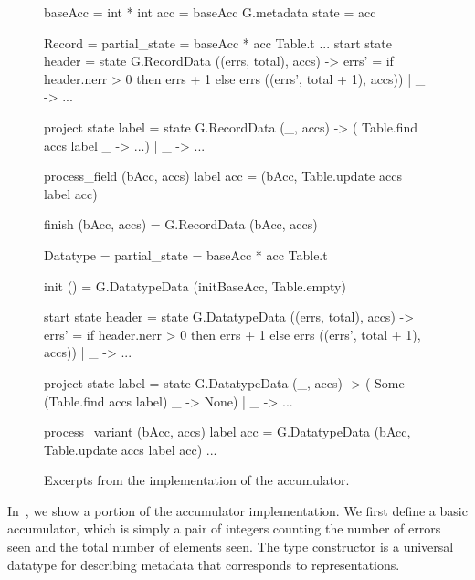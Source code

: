 \begin{figure}
\begin{code}\scriptsize
{} baseAcc = int * int
 acc = baseAcc G.metadata
 state = acc

 Record = 
   partial_state = baseAcc * acc Table.t
  ... 
   start state header =
     state 
      G.RecordData ((errs, total), accs) ->
	 errs' = if header.nerr > 0
                    then errs + 1 else errs
	 ((errs', total + 1), accs))
    | _ ->  ...
	  
   project state label =  state 
      G.RecordData (_, accs) -> ( Table.find accs label
                                  _ ->  ...)
    | _ ->  ...

   process_field (bAcc, accs) label acc =
    (bAcc, Table.update accs label acc)
      
   finish (bAcc, accs) = G.RecordData (bAcc, accs)
    
 Datatype = 
   partial_state = baseAcc * acc Table.t
	
   init () = G.DatatypeData (initBaseAcc, Table.empty)

   start state header = 
     state 
      G.DatatypeData ((errs, total), accs) ->
	 errs' = if header.nerr > 0
                    then errs + 1 else errs
	 ((errs', total + 1), accs))
    | _ ->  ...
	  
   project state label =  state 
    G.DatatypeData (_, accs) -> ( Some (Table.find accs label)
                                  _ -> None)
  | _ ->  ...
	  
   process_variant (bAcc, accs) label acc =
    G.DatatypeData (bAcc, Table.update accs label acc)
...
\end{code}
\caption{Excerpts from the implementation of the accumulator.}
\label{fig:gentool-accum-code}
\end{figure}

In~, we show a portion of the
accumulator implementation. We first define a basic accumulator, which
is simply a pair of integers counting the number of errors seen and
the total number of elements seen. The type constructor
 is a universal datatype for describing metadata that
corresponds to \padsml{} representations.

